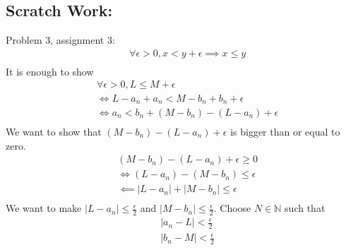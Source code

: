 \documentclass{article}
\begin{document}
\subsection{Scratch Work:}
Problem 3, assignment 3:
\begin{align*}
 	& \forall \epsilon > 0, x < y + \epsilon \implies x \leq y \\
\end{align*}
It is enough to show
\begin{align*}
 	& \forall \epsilon > 0, L \leq M + \epsilon \\
 	& \iff L - a_n + a_n < M - b_n + b_n  + \epsilon \\
 	& \iff a_n < b_n + (M - b_n) - (L - a_n) + \epsilon \\
\end{align*}
We want to show that $(M - b_n) - (L - a_n) + \epsilon$ is bigger than or equal to zero.
\begin{align*}
 	& (M - b_n) - (L - a_n) + \epsilon \geq 0 \\
 	& \iff (L - a_n) - (M - b_n) \leq \epsilon \\
 	& \impliedby | L - a_n | + |M - b_n| \leq \epsilon \\
\end{align*}
We want to make $|L - a_n| \leq \frac{\epsilon}{2}$ and $|M - b_n| \leq \frac{\epsilon}{2}$. Choose $N \in \mathbb{N}$ such that
\begin{align*}
 	& |a_n - L| < \frac{\epsilon}{2} \\
 	& |b_n - M| < \frac{\epsilon}{2} \\
\end{align*}
\end{document}
